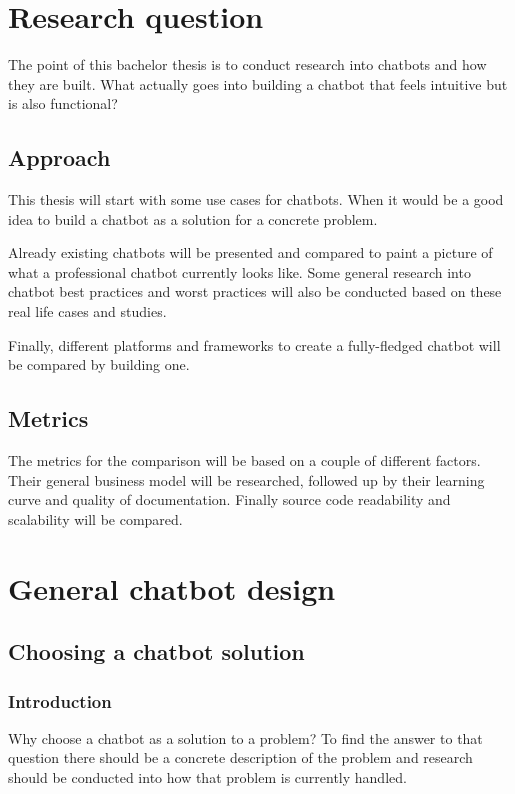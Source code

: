 \chapter{Research question}

The point of this bachelor thesis is to conduct research into chatbots and how they are built. What actually goes into building a chatbot that feels intuitive but is also functional?

\section{Approach}

This thesis will start with some use cases for chatbots. When it would be a good idea to build a chatbot as a solution for a concrete problem.

Already existing chatbots will be presented and compared to paint a picture of what a professional chatbot currently looks like.
Some general research into chatbot best practices and worst practices will also be conducted based on these real life cases and studies.

Finally, different platforms and frameworks to create a fully-fledged chatbot will be compared by building one.

\section{Metrics}

The metrics for the comparison will be based on a couple of different factors. Their general business model will be researched, followed up by their learning curve and quality of documentation. Finally source code readability and scalability will be compared.

\chapter{General chatbot design}

\section{Choosing a chatbot solution}

\subsection{Introduction}

Why choose a chatbot as a solution to a problem? To find the answer to that question there should be a concrete description of the problem and research should be conducted into how that problem is currently handled.

